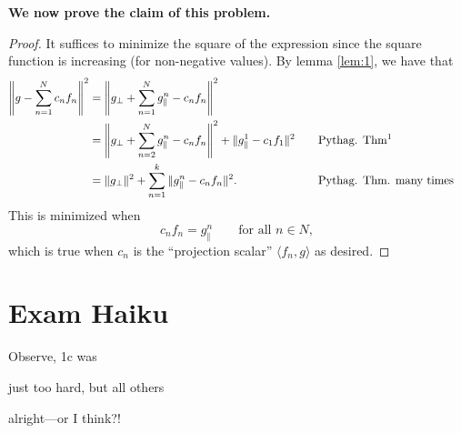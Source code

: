 \documentclass[10pt]{article}
\begin{document}
\noindent
\textbf{We now prove the claim of this problem.}

\begin{proof}
    It suffices to minimize the square of the expression since the square function is increasing (for non-negative values). By lemma \ref{lem:1}, we have that
    \begin{alignat*}{2}
        \left\Vert g - \sum_{n=1}^{N}c_nf_n\right\Vert^2 &= \left\Vert g_\perp + \sum_{n=1}^{N} g^n_\Vert - c_nf_n\right\Vert^2\\
        &= \left\Vert g_\perp + \sum_{n=2}^{N} g^n_\Vert - c_nf_n\right\Vert^2 + \Vert g_\Vert^1 - c_1f_1\Vert^2 \quad&&\text{Pythag. Thm\footnotemark}\\
        &= \Vert g_\perp \Vert^2 + \sum_{n=1}^{k}\Vert g_\Vert^n-c_nf_n\Vert^2. &&\text{Pythag. Thm. many times}
    \end{alignat*}
    This is minimized when
    \[c_nf_n = g_\Vert^n \qquad\text{for all $n\in N,$}\]
    which is true when $c_n$ is the ``projection scalar'' $\langle f_n,g\rangle$ as desired.
\end{proof}
\section*{Exam Haiku}

Observe, 1c was %

just too hard, but all others %

alright---or I think?!%
\end{document}
